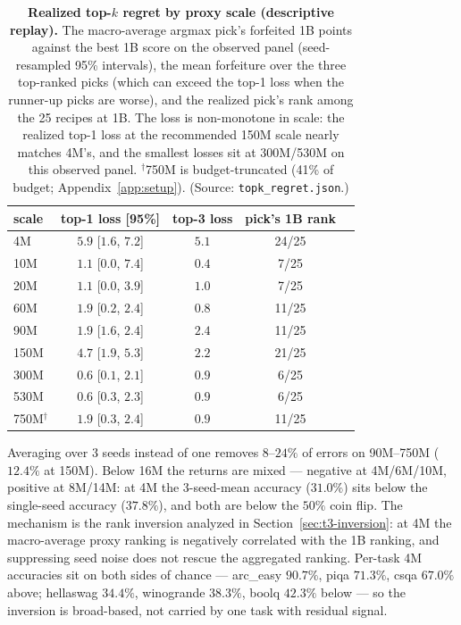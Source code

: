 \begin{table}[!htbp]
\centering
\caption{\textbf{Realized top-$k$ regret by proxy scale (descriptive replay).} The
macro-average argmax pick's forfeited 1B points against the best 1B score on the observed panel (seed-resampled
95\% intervals), the mean forfeiture over the three top-ranked picks (which can exceed the top-1 loss when the runner-up picks are worse), and the realized pick's rank among the 25 recipes at 1B.
The loss is non-monotone in scale: the realized top-1 loss at the recommended 150M scale nearly matches 4M's, and the smallest losses sit at 300M/530M on this observed panel. $^\dagger$750M is budget-truncated (41\% of budget;
Appendix~\ref{app:setup}). (Source: \texttt{topk\_regret.json}.)}
\label{tab:regret}
\footnotesize
\begin{tabular}{@{}lcccc@{}}
\toprule
scale & top-1 loss [95\%] & top-3 loss & pick's 1B rank \\
\midrule
4M & $5.9$ [$1.6$, $7.2$] & $5.1$ & 24/25 \\
10M & $1.1$ [$0.0$, $7.4$] & $0.4$ & 7/25 \\
20M & $1.1$ [$0.0$, $3.9$] & $1.0$ & 7/25 \\
60M & $1.9$ [$0.2$, $2.4$] & $0.8$ & 11/25 \\
90M & $1.9$ [$1.6$, $2.4$] & $2.4$ & 11/25 \\
150M & $4.7$ [$1.9$, $5.3$] & $2.2$ & 21/25 \\
300M & $0.6$ [$0.1$, $2.1$] & $0.9$ & 6/25 \\
530M & $0.6$ [$0.3$, $2.3$] & $0.9$ & 6/25 \\
750M$^{\dagger}$ & $1.9$ [$0.3$, $2.4$] & $0.9$ & 11/25 \\
\bottomrule
\end{tabular}
\end{table}

Averaging over 3 seeds instead of one removes
$8$--$24\%$ of errors on 90M--750M ($12.4\%$ at 150M). Below 16M the returns are mixed ---
negative at 4M/6M/10M, positive at 8M/14M: at 4M
the 3-seed-mean accuracy ($31.0\%$) sits below the single-seed accuracy ($37.8\%$), and both
are below the $50\%$ coin flip. The mechanism is the rank inversion analyzed in
Section~\ref{sec:t3-inversion}: at 4M the macro-average proxy ranking is negatively correlated with the 1B
ranking, and suppressing seed noise does not rescue the aggregated ranking.
Per-task 4M accuracies sit on both sides of chance --- arc\_easy $90.7\%$, piqa $71.3\%$,
csqa $67.0\%$ above; hellaswag $34.4\%$, winogrande $38.3\%$, boolq $42.3\%$ below --- so the
inversion is broad-based, not carried by one task with residual signal.

